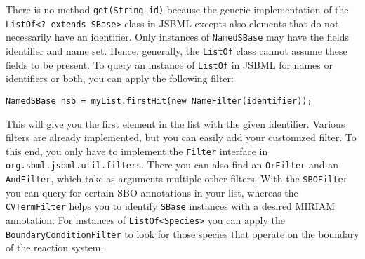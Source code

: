 \documentclass[a4paper,11pt]{scrartcl}
\begin{document}
There is no method \verb!get(String id)! because the generic implementation of 
the \verb!ListOf<? extends SBase>! class in JSBML excepts also elements that do 
not necessarily have an identifier. Only instances of \verb!NamedSBase! may have
the fields identifier and name set. Hence, generally, the \verb!ListOf! class 
cannot assume these fields to be present. To query an instance of \verb!ListOf! 
in JSBML for names or identifiers or both, you can apply the following 
filter:
\begin{verbatim}
NamedSBase nsb = myList.firstHit(new NameFilter(identifier));
\end{verbatim}
This will give you the first element in the list with the given identifier.
Various filters are already implemented, but you can easily add your 
customized filter. To this end, you only have to implement the \verb!Filter! 
interface in \verb!org.sbml.jsbml.util.filters!. There you can also find an
\verb!OrFilter! and an \verb!AndFilter!, which take as arguments multiple other
filters. With the \verb!SBOFilter! you can query for certain SBO annotations in
your list, whereas the \verb!CVTermFilter! helps you to identify \verb!SBase!
instances with a desired MIRIAM annotation. For instances of
\verb!ListOf<Species>! you can apply the \verb!BoundaryConditionFilter! to look
for those species that operate on the boundary of the reaction system.


% 
% 
\end{document}
